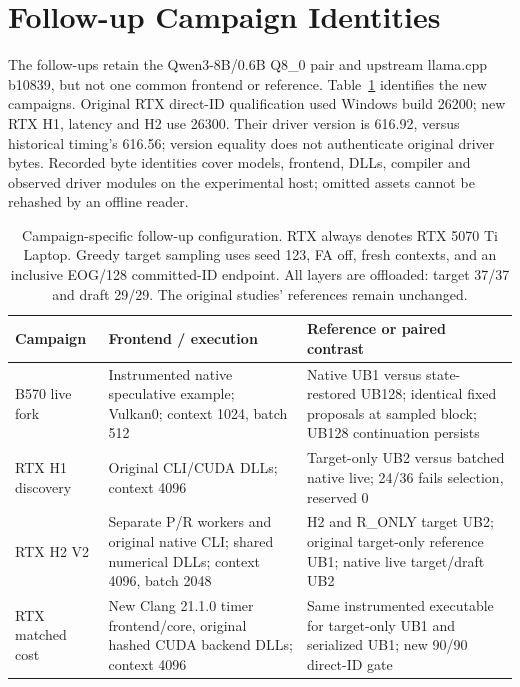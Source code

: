\clearpage
\section{Follow-up Campaign Identities}
\label{app:followupconfigs}
The follow-ups retain the Qwen3-8B/0.6B Q8\_0 pair and upstream llama.cpp b10839, but not one common frontend or reference. Table~\ref{tab:followupconfigs} identifies the new campaigns. Original RTX direct-ID qualification used Windows build 26200; new RTX H1, latency and H2 use 26300. Their driver version is 616.92, versus historical timing's 616.56; version equality does not authenticate original driver bytes. Recorded byte identities cover models, frontend, DLLs, compiler and observed driver modules on the experimental host; omitted assets cannot be rehashed by an offline reader.

\begin{table}[t]
\caption{Campaign-specific follow-up configuration. RTX always denotes RTX 5070 Ti Laptop. Greedy target sampling uses seed 123, FA off, fresh contexts, and an inclusive EOG/128 committed-ID endpoint. All layers are offloaded: target 37/37 and draft 29/29. The original studies' references remain unchanged.}
\label{tab:followupconfigs}
\centering
\begin{tabular}{>{\raggedright\arraybackslash}p{1.15in}>{\raggedright\arraybackslash}p{2.15in}>{\raggedright\arraybackslash}p{2.45in}}
\toprule
Campaign & Frontend / execution & Reference or paired contrast \\
\midrule
B570 live fork & Instrumented native speculative example; Vulkan0; context 1024, batch 512 & Native UB1 versus state-restored UB128; identical fixed proposals at sampled block; UB128 continuation persists \\
RTX H1 discovery & Original CLI/CUDA DLLs; context 4096 & Target-only UB2 versus batched native live; 24/36 fails selection, reserved 0 \\
RTX H2 V2 & Separate P/R workers and original native CLI; shared numerical DLLs; context 4096, batch 2048 & H2 and R\_ONLY target UB2; original target-only reference UB1; native live target/draft UB2 \\
RTX matched cost & New Clang 21.1.0 timer frontend/core, original hashed CUDA backend DLLs; context 4096 & Same instrumented executable for target-only UB1 and serialized UB1; new 90/90 direct-ID gate \\
\bottomrule
\end{tabular}
\end{table}

